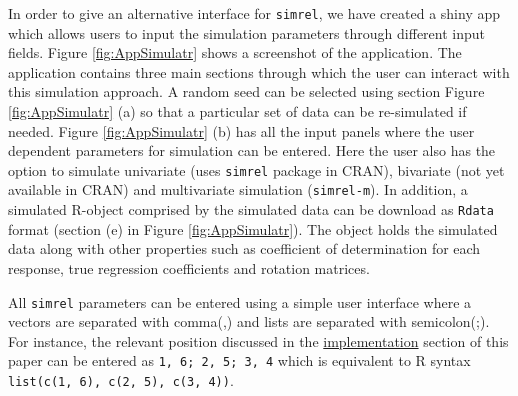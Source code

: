 \documentclass[3p,times,12pt,authoryear]{elsarticle}
\theoremstyle{definition}
\theoremstyle{definition}
\theoremstyle{remark}
\begin{document}
In order to give an alternative interface for \texttt{simrel}, we have
created a shiny app which allows users to input the simulation
parameters through different input fields. Figure \ref{fig:AppSimulatr}
shows a screenshot of the application. The application contains three
main sections through which the user can interact with this simulation
approach. A random seed can be selected using section Figure
\ref{fig:AppSimulatr} (a) so that a particular set of data can be
re-simulated if needed. Figure \ref{fig:AppSimulatr} (b) has all the
input panels where the user dependent parameters for simulation can be
entered. Here the user also has the option to simulate univariate (uses
\texttt{simrel} package in CRAN), bivariate (not yet available in CRAN)
and multivariate simulation (\texttt{simrel-m}). In addition, a
simulated R-object comprised by the simulated data can be download as
\texttt{Rdata} format (section (e) in Figure \ref{fig:AppSimulatr}). The
object holds the simulated data along with other properties such as
coefficient of determination for each response, true regression
coefficients and rotation matrices.

All \texttt{simrel} parameters can be entered using a simple user
interface where a vectors are separated with comma(,) and lists are
separated with semicolon(;). For instance, the relevant position
discussed in the \protect\hyperlink{implementation}{implementation}
section of this paper can be entered as \texttt{1,\ 6;\ 2,\ 5;\ 3,\ 4}
which is equivalent to R syntax
\texttt{list(c(1,\ 6),\ c(2,\ 5),\ c(3,\ 4))}.
\end{document}
